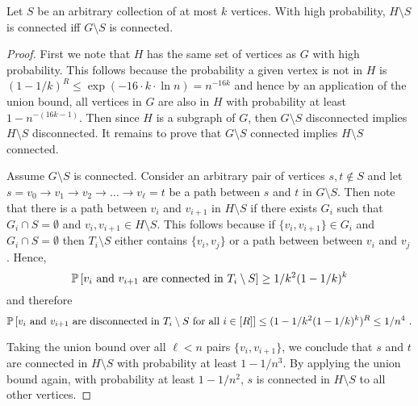 \begin{lemma}
Let $S$ be an arbitrary collection of at most $k$ vertices. With high probability, $H\setminus S$ is connected iff $G\setminus S$ is connected.
\end{lemma}

\begin{proof}
First we note that $H$ has the same set of vertices as $G$ with high probability. This follows because the probability a given vertex is not in $H$ is $(1-1/k)^R\leq \exp(-16\cdot k \cdot \ln n)=n^{-16k}$ and hence by an application of the union bound, all vertices in $G$ are also in $H$ with probability at least $1-n^{-(16k-1)}$. Then since $H$ is a subgraph of $G$, then $G\setminus S$ disconnected implies  $H\setminus S$ disconnected. It remains to prove that $G\setminus S$ connected implies $H\setminus S$ connected.

Assume $G\setminus S$ is connected. Consider an arbitrary pair of vertices $s,t \not \in S$ and let 
$s=v_0\rightarrow v_1 \rightarrow v_2 \rightarrow \ldots \rightarrow v_\ell=t$
be a  path between $s$ and $t$ in $G\setminus S$.
Then note that there is a path between $v_i$ and $v_{i+1}$ in $H\setminus S$ if there exists $G_i$ such that $G_i\cap S=\emptyset$ and $v_i,v_{i+1}\in H\setminus S$. This follows because if $\{v_i,v_{i+1}\}\in G_i$ and $G_i\cap S=\emptyset$ then $T_i\setminus S$ either contains $\{v_i,v_j\}$ or a path between between $v_i$ and $v_j$. Hence,
\[
\mathbb P \left [ \mbox{$v_i$ and $v_{i+1}$ are connected in $T_i\setminus S$} \right ] \geq 1/k^2 (1-1/k)^k
\]
and therefore 
$$\mathbb P \left [ \mbox{$v_i$ and $v_{i+1}$ are disconnected in $T_i\setminus S$ for all $i\in [R]$} \right ] \leq (1-1/k^2 (1-1/k)^k)^R \leq 1/n^4 \ .$$

\begin{comment}
\begin{eqnarray*}
& & \prob{\mbox{$v_i$ and $v_{i+1}$ are disconnected in $T_i\setminus S$ for all $i\in [R]$}} \\
&\leq & (1-1/k^2 (1-1/k)^k)^R 
\leq 1/n^4 \ .
\end{eqnarray*}
\end{comment}

Taking the union bound over all $\ell <n$ pairs $\{v_i, v_{i+1}\}$, we conclude that 
$s$ and $t$ are connected in $H\setminus S$ with probability at least $1-1/n^3$. By applying the union bound again, with probability at least $1-1/n^2$, $s$ is connected in $H\setminus S$ to all other vertices.
\end{proof}

